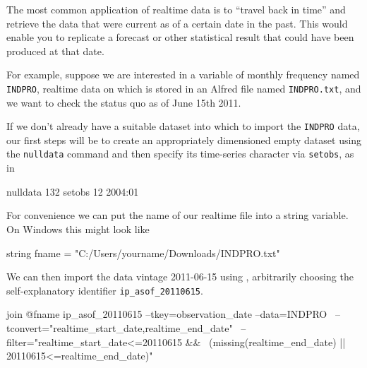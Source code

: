 The most common application of realtime data is to ``travel back in
time'' and retrieve the data that were current as of a certain date
in the past. This would enable you to replicate a forecast or other
statistical result that could have been produced at that date.

For example, suppose we are interested in a variable of monthly
frequency named \texttt{INDPRO}, realtime data on which is stored in
an Alfred file named \texttt{INDPRO.txt}, and we want to check the
status quo as of June 15th 2011.

If we don't already have a suitable dataset into which to import the
\texttt{INDPRO} data, our first steps will be to create an
appropriately dimensioned empty dataset using the \texttt{nulldata}
command and then specify its time-series character via
\texttt{setobs}, as in
\begin{code}
nulldata 132
setobs 12 2004:01
\end{code}

For convenience we can put the name of our realtime file into a
string variable. On Windows this might look like
\begin{code}
string fname = "C:/Users/yourname/Downloads/INDPRO.txt"
\end{code}

We can then import the data vintage 2011-06-15 using ,
arbitrarily choosing the self-explanatory identifier
\texttt{ip\_asof\_20110615}.

\begin{code}
join @fname ip_asof_20110615 --tkey=observation_date --data=INDPRO \
--tconvert="realtime_start_date,realtime_end_date" \
--filter="realtime_start_date<=20110615 && \
(missing(realtime_end_date) || 20110615<=realtime_end_date)"
\end{code}

